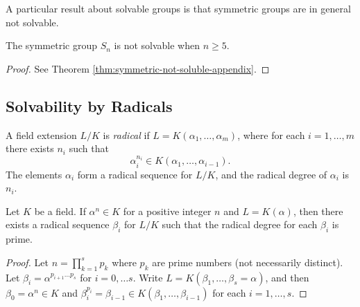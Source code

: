 A particular result about solvable groups is that symmetric groups are in general not solvable.

\begin{theorem} \label{thm:symmetric-not-soluble}
	The symmetric group $S_n$ is not solvable when $n \ge 5$. 
\end{theorem}
\begin{proof}
	See Theorem \ref{thm:symmetric-not-soluble-appendix}. 
\end{proof}




\subsection{Solvability by Radicals}

\begin{definition} \label{def:radical-extension}
	A field extension $L / K$ is \textit{radical} if $L=K\left(\alpha_1, \ldots, \alpha_m\right)$, where for each $i=1, \ldots, m$ there exists $n_i$ such that
	$$
	\alpha_i^{n_i} \in K\left(\alpha_1, \ldots, \alpha_{i-1}\right).
	$$
	The elements $\alpha_i$ form a radical sequence for $L / K$, and the radical degree of $\alpha_i$ is $n_i$.
\end{definition}



\begin{theorem} \label{thm:radical-single-prime}
	Let $K$ be a field. If $\alpha ^ n \in K$ for a positive integer $n$ and  $L = K (\alpha)$, then there exists a radical sequence $\beta_i$ for $L / K$ such that the radical degree for each $\beta_i$ is prime.
\end{theorem}

\begin{proof}
	Let $n = \prod_{k=1}^{s} p_{k}$ where $p_{k}$ are prime numbers (not necessarily distinct). Let $\beta_{i} = \alpha^ {p_{i + 1} \dots  p_{s}}$ for $i = 0, \dots s$. Write $L = K(\beta_1,  \dots, \beta_s = \alpha)$, and then $\beta_0 = \alpha^n \in K$ and  $\beta_i ^ {p_i} = \beta_{i-1} \in K(\beta_1, \dots, \beta_{i - 1})$ for each $i  = 1, \dots, s$. 
\end{proof}


